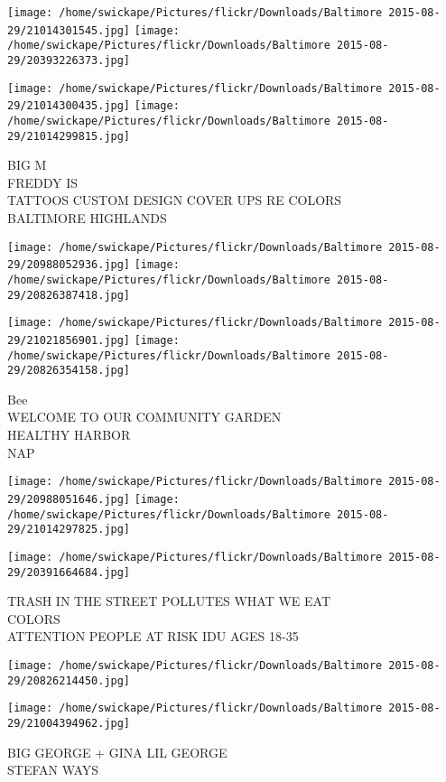 \documentclass[10pt,letterpaper]{article}
\begin{document}
\texttt{[image: /home/swickape/Pictures/flickr/Downloads/Baltimore 2015-08-29/21014301545.jpg]}
\texttt{[image: /home/swickape/Pictures/flickr/Downloads/Baltimore 2015-08-29/20393226373.jpg]}

\texttt{[image: /home/swickape/Pictures/flickr/Downloads/Baltimore 2015-08-29/21014300435.jpg]}
\texttt{[image: /home/swickape/Pictures/flickr/Downloads/Baltimore 2015-08-29/21014299815.jpg]}

BIG M\\
FREDDY IS\\
TATTOOS CUSTOM DESIGN COVER UPS RE COLORS\\
BALTIMORE HIGHLANDS
\pagebreak

\texttt{[image: /home/swickape/Pictures/flickr/Downloads/Baltimore 2015-08-29/20988052936.jpg]}
\texttt{[image: /home/swickape/Pictures/flickr/Downloads/Baltimore 2015-08-29/20826387418.jpg]}

\texttt{[image: /home/swickape/Pictures/flickr/Downloads/Baltimore 2015-08-29/21021856901.jpg]}
\texttt{[image: /home/swickape/Pictures/flickr/Downloads/Baltimore 2015-08-29/20826354158.jpg]}

Bee\\
WELCOME TO OUR COMMUNITY GARDEN\\
HEALTHY HARBOR\\
NAP
\pagebreak

\texttt{[image: /home/swickape/Pictures/flickr/Downloads/Baltimore 2015-08-29/20988051646.jpg]}
\texttt{[image: /home/swickape/Pictures/flickr/Downloads/Baltimore 2015-08-29/21014297825.jpg]}

\texttt{[image: /home/swickape/Pictures/flickr/Downloads/Baltimore 2015-08-29/20391664684.jpg]}

TRASH IN THE STREET POLLUTES WHAT WE EAT\\
COLORS\\
ATTENTION PEOPLE AT RISK IDU AGES 18{-}35
\pagebreak

\texttt{[image: /home/swickape/Pictures/flickr/Downloads/Baltimore 2015-08-29/20826214450.jpg]}

\vspace{0.25in}
\texttt{[image: /home/swickape/Pictures/flickr/Downloads/Baltimore 2015-08-29/21004394962.jpg]}

BIG GEORGE + GINA LIL GEORGE\\
STEFAN WAYS
\pagebreak
\end{document}
